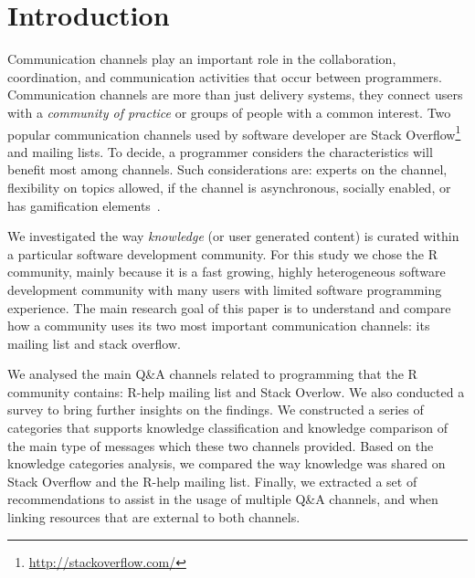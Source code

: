 \section{Introduction}
\label{cha:introduction}

    Communication channels play an important role in the collaboration, coordination, and communication activities that occur between programmers.
    Communication channels are more than just delivery systems, they connect users with a \textit{community of practice} or groups of people with a common interest.
    Two popular communication channels used by software developer are Stack Overflow\footnote{\url{http://stackoverflow.com/}} and mailing lists.
    To decide, a programmer considers the characteristics will benefit most among channels.
    Such considerations are: experts on the channel, flexibility on topics allowed, if the channel is asynchronous, socially enabled, or has gamification elements~\cite{Vasilescu2014c}.

    We investigated the way \textit{knowledge} (or user generated content) is curated within a particular software development community.
    For this study we chose the R community, mainly because it is a fast growing, highly heterogeneous software development community with many users with
    limited software programming experience.
    The main research goal of this paper is to understand and compare how a community uses its two most important communication channels: its mailing list and
    stack overflow. 

    We analysed the main Q\&A channels related to programming that the R community contains: R-help mailing list and Stack Overlow.
    We also conducted a survey to bring further insights on the findings.
    We constructed a series of categories that supports knowledge classification and knowledge comparison of the main type of messages which these two channels provided.
    Based on the knowledge categories analysis, we compared the way knowledge was shared on Stack Overflow and the R-help mailing list.
    Finally, we extracted a set of recommendations to assist in the usage of multiple Q\&A channels, and when linking resources that are external to both channels.

